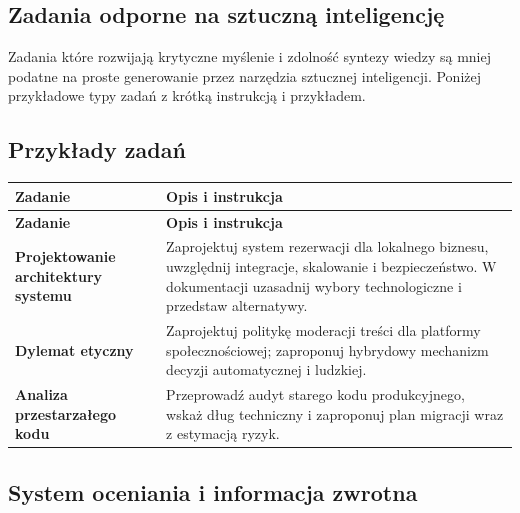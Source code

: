 \documentclass[12pt,a4paper]{article}
\newcommand{\thdrule}{\noalign{\global\setlength{\extrarowheight}{0pt}}}
\newcommand{\thdend}{\noalign{\global\setlength{\extrarowheight}{4pt}}}
\begin{document}
\subsection*{Zadania odporne na sztuczną inteligencję}

\noindent Zadania które rozwijają krytyczne myślenie i zdolność syntezy wiedzy są mniej podatne na proste generowanie przez narzędzia sztucznej inteligencji. Poniżej przykładowe typy zadań z krótką instrukcją i przykładem.
\medskip
\subsection*{Przykłady zadań}

{\scriptsize
\begin{longtable}{m{4.5cm}m{10cm}}
\thdrule\toprule
\rowcolor{pjatkRed}
{\color{white}\footnotesize\textbf{\vphantom{Ag}Zadanie}} & {\color{white}\footnotesize\textbf{\vphantom{Ag}Opis i instrukcja}} \\
\midrule\thdend
\endfirsthead
\thdrule\toprule
\rowcolor{pjatkRed}
{\color{white}\footnotesize\textbf{\vphantom{Ag}Zadanie}} & {\color{white}\footnotesize\textbf{\vphantom{Ag}Opis i instrukcja}} \\
\midrule\thdend
\endhead
\rowcolor{tableRowLight} \textbf{Projektowanie architektury systemu} & Zaprojektuj system rezerwacji dla lokalnego biznesu, uwzględnij integracje, skalowanie i bezpieczeństwo. W dokumentacji uzasadnij wybory technologiczne i przedstaw alternatywy. \\
\rowcolor{tableRowAlt} \textbf{Dylemat etyczny} & Zaprojektuj politykę moderacji treści dla platformy społecznościowej; zaproponuj hybrydowy mechanizm decyzji automatycznej i ludzkiej. \\
\rowcolor{tableRowLight} \textbf{Analiza przestarzałego kodu} & Przeprowadź audyt starego kodu produkcyjnego, wskaż dług techniczny i zaproponuj plan migracji wraz z estymacją ryzyk. \\
\bottomrule
\end{longtable}}
\medskip
\subsection*{System oceniania i informacja zwrotna}
\end{document}
